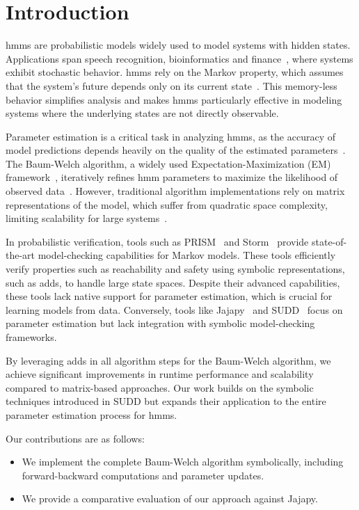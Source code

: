 \section{Introduction}\label{sec:introduction}
\glspl{hmm} are probabilistic models widely used to model systems with hidden states. 
Applications span speech recognition, bioinformatics and finance~\cite{chavan2013overview,ciocchetta2009bio, mamon2007hidden}, where systems exhibit stochastic behavior. 
\glspl{hmm} rely on the Markov property, which assumes that the system's future depends only on its current state~\cite{baum1966statistical}. 
This memory-less behavior simplifies analysis and makes \glspl{hmm} particularly effective in modeling systems where the underlying states are not directly observable.

Parameter estimation is a critical task in analyzing \glspl{hmm}, as the accuracy of model predictions depends heavily on the quality of the estimated parameters~\cite{bacci2023mm}. 
The Baum-Welch algorithm, a widely used Expectation-Maximization (EM) framework~\cite{kenny2014deep}, iteratively refines \gls{hmm} parameters to maximize the likelihood of observed data~\cite{levinson1983introduction}. 
However, traditional algorithm implementations rely on matrix representations of the model, which suffer from quadratic space complexity, limiting scalability for large systems~\cite{davis2004comparing}.

In probabilistic verification, tools such as PRISM~\cite{kwiatkowska2011prism} and Storm~\cite{hensel2021probabilistic} provide state-of-the-art model-checking capabilities for Markov models. 
These tools efficiently verify properties such as reachability and safety using symbolic representations, such as \glspl{add}, to handle large state spaces. 
Despite their advanced capabilities, these tools lack native support for parameter estimation, which is crucial for learning models from data. 
Conversely, tools like Jajapy~\cite{reynouard2023jajapy} and SUDD~\cite{p7} focus on parameter estimation but lack integration with symbolic model-checking frameworks.

By leveraging \glspl{add} in all algorithm steps for the Baum-Welch algorithm, we achieve significant improvements in runtime performance and scalability compared to matrix-based approaches. 
Our work builds on the symbolic techniques introduced in SUDD but expands their application to the entire parameter estimation process for \glspl{hmm}. 

Our contributions are as follows:
\begin{itemize}
    \item We implement the complete Baum-Welch algorithm symbolically, including forward-backward computations and parameter updates.
    \item We provide a comparative evaluation of our approach against Jajapy.
\end{itemize}

